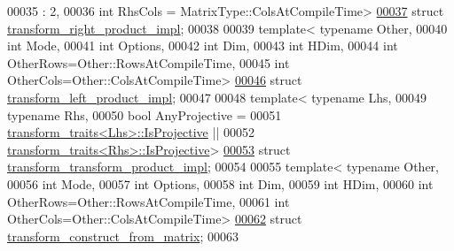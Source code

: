 \begin{DoxyCode}
00035                    : 2,
00036           \textcolor{keywordtype}{int} RhsCols = MatrixType::ColsAtCompileTime>
\hyperlink{struct_eigen_1_1internal_1_1transform__right__product__impl}{00037} \textcolor{keyword}{struct }\hyperlink{struct_eigen_1_1internal_1_1transform__right__product__impl}{transform\_right\_product\_impl};
00038 
00039 \textcolor{keyword}{template}< \textcolor{keyword}{typename} Other,
00040           \textcolor{keywordtype}{int} Mode,
00041           \textcolor{keywordtype}{int} Options,
00042           \textcolor{keywordtype}{int} Dim,
00043           \textcolor{keywordtype}{int} HDim,
00044           \textcolor{keywordtype}{int} OtherRows=Other::RowsAtCompileTime,
00045           \textcolor{keywordtype}{int} OtherCols=Other::ColsAtCompileTime>
\hyperlink{struct_eigen_1_1internal_1_1transform__left__product__impl}{00046} \textcolor{keyword}{struct }\hyperlink{struct_eigen_1_1internal_1_1transform__left__product__impl}{transform\_left\_product\_impl};
00047 
00048 \textcolor{keyword}{template}< \textcolor{keyword}{typename} Lhs,
00049           \textcolor{keyword}{typename} Rhs,
00050           \textcolor{keywordtype}{bool} AnyProjective = 
00051             \hyperlink{struct_eigen_1_1internal_1_1transform__traits}{transform\_traits<Lhs>::IsProjective} ||
00052             \hyperlink{struct_eigen_1_1internal_1_1transform__traits}{transform\_traits<Rhs>::IsProjective}>
\hyperlink{struct_eigen_1_1internal_1_1transform__transform__product__impl}{00053} \textcolor{keyword}{struct }\hyperlink{struct_eigen_1_1internal_1_1transform__transform__product__impl}{transform\_transform\_product\_impl};
00054 
00055 \textcolor{keyword}{template}< \textcolor{keyword}{typename} Other,
00056           \textcolor{keywordtype}{int} Mode,
00057           \textcolor{keywordtype}{int} Options,
00058           \textcolor{keywordtype}{int} Dim,
00059           \textcolor{keywordtype}{int} HDim,
00060           \textcolor{keywordtype}{int} OtherRows=Other::RowsAtCompileTime,
00061           \textcolor{keywordtype}{int} OtherCols=Other::ColsAtCompileTime>
\hyperlink{struct_eigen_1_1internal_1_1transform__construct__from__matrix}{00062} \textcolor{keyword}{struct }\hyperlink{struct_eigen_1_1internal_1_1transform__construct__from__matrix}{transform\_construct\_from\_matrix};
00063 

\end{DoxyCode}
